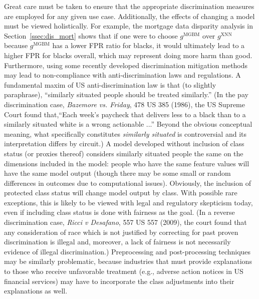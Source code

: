 \documentclass[information,article,accept,moreauthors,pdftex]{Definitions/mdpi}
\begin{document}
Great care must be taken to ensure that the appropriate discrimination measures are employed for any given use case. Additionally, the effects of changing a model must be viewed holistically.  For example, the mortgage data disparity analysis in Section~\ref{ssec:dis_mort} shows that if one were to choose $g^\text{MGBM}$ over $g^\text{XNN}$ because $g^\text{MGBM}$ has a lower FPR ratio for blacks, it would ultimately lead to a higher FPR for blacks overall, which may represent doing more harm than good. Furthermore, using some recently developed discrimination mitigation methods may lead to non-compliance with anti-discrimination laws and regulations.  A fundamental maxim of US anti-discrimination law is that (to slightly paraphrase), ``similarly situated people should be treated similarly.'' ({{In the pay discrimination case,} \textit{Bazemore vs. Friday}, 478 US 385 (1986), the US Supreme Court found that,``Each week's paycheck that delivers less to a black than to a similarly situated white is a wrong actionable ...''  Beyond the obvious conceptual meaning, what specifically constitutes \textit{similarly situated} is controversial and its interpretation differs by circuit.}) %
A model developed without inclusion of class status (or proxies thereof) considers similarly situated people the same on the dimensions included in the model: people who have the same feature values will have the same model output (though there may be some small or random differences in outcomes due to computational issues). Obviously, the inclusion of protected class status will change model output by class. With possible rare exceptions, this is likely to be viewed with legal and regulatory skepticism today, even if including class status is done with fairness as the goal. (In a reverse discrimination case, \textit{Ricci v Desafano}, 557 US 557 (2009), the court found that any consideration of race which is not justified by correcting for past proven discrimination is illegal and, moreover, a lack of fairness is not necessarily evidence of illegal discrimination.) Preprocessing and post-processing techniques may be similarly problematic, because industries that must provide explanations to those who receive unfavorable treatment (e.g., adverse action notices in US financial services) may have to incorporate the class adjustments into their explanations as well.

\end{document}
